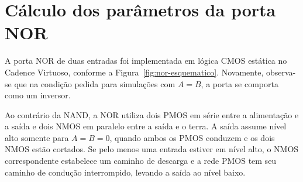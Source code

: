 \documentclass[a4paper]{article}
\begin{document}
\begin{table}[!htbp]
    \centering
    \small
    \caption{Comparação entre as simulações de esquemático e PEX da porta NAND.}
    \label{tab:nand-esquematico-pex}
\end{table}

\FloatBarrier


\section{Cálculo dos parâmetros da porta NOR}

A porta NOR de duas entradas foi implementada em lógica CMOS estática no Cadence Virtuoso, conforme a Figura~\ref{fig:nor-esquematico}. Novamente, observa-se que na condição pedida para simulações com $A = B$, a porta se comporta como um inversor.

Ao contrário da NAND, a NOR utiliza dois PMOS em série entre a alimentação e a saída e dois NMOS em paralelo entre a saída e o terra. A saída assume nível alto somente para $A=B=0$, quando ambos os PMOS conduzem e os dois NMOS estão cortados. Se pelo menos uma entrada estiver em nível alto, o NMOS correspondente estabelece um caminho de descarga e a rede PMOS tem seu caminho de condução interrompido, levando a saída ao nível baixo.
\end{document}
